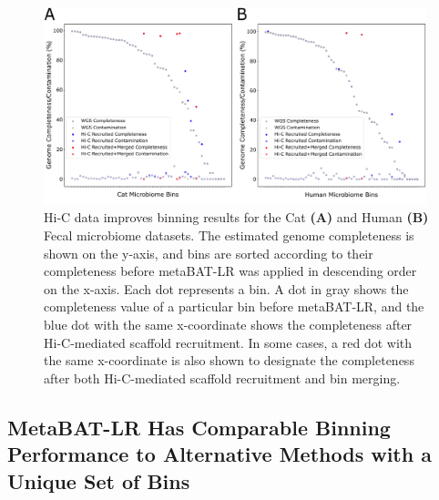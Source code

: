 \documentclass[fleqn,10pt,lineno]{wlpeerj}
\begin{document}



\begin{figure}[ht!]
	\centering
	\includegraphics[width=0.99\textwidth]{Figure3_10c_Filtered_Conda.pdf}
	\caption{Hi-C data improves binning results for the Cat \textbf{(A)} and Human \textbf{(B)} Fecal microbiome datasets. The estimated genome completeness is shown on the y-axis, and bins are sorted according to their completeness before metaBAT-LR was applied in descending order on the x-axis. Each dot represents a bin. A dot in gray shows the completeness value of a particular bin before metaBAT-LR, and the blue dot with the same x-coordinate shows the completeness after Hi-C-mediated scaffold recruitment. In some cases, a red dot with the same x-coordinate is also shown to designate the completeness after both Hi-C-mediated scaffold recruitment and bin merging. }
	\label{fig:Cat_and_human}
\end{figure}

\subsection*{MetaBAT-LR Has Comparable Binning Performance to Alternative Methods with a Unique Set of Bins}
\end{document}
